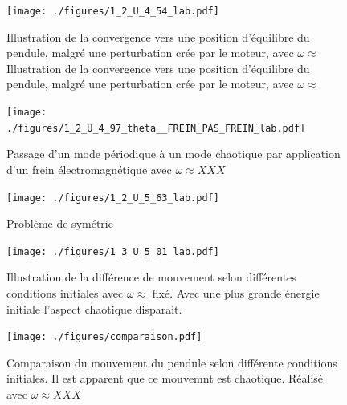 \documentclass[a4paper,12pt,oneside]{article}
\begin{document}
\begin{figure}[h!]
  \begin{center}
  \texttt{[image: ./figures/1\_2\_U\_4\_54\_lab.pdf]}
  \caption{Illustration de la convergence vers une position d'équilibre du pendule, malgré une perturbation crée par le moteur, avec $\omega \approx$Illustration de la convergence vers une position d'équilibre du pendule, malgré une perturbation crée par le moteur, avec $\omega \approx$} \label{fig:1_2_U_4_54_lab}
  \end{center}
\end{figure}

\begin{figure}[h!]
  \begin{center}
  \texttt{[image: ./figures/1\_2\_U\_4\_97\_theta\_\_FREIN\_PAS\_FREIN\_lab.pdf]}
  \caption{Passage d'un mode périodique à un mode chaotique par application d'un frein électromagnétique avec $\omega \approx XXX$} \label{fig:1_2_U_4_97_theta__FREIN_PAS_FREIN_lab}
  \end{center}
\end{figure}


\begin{figure}[h!]
  \begin{center}
  \texttt{[image: ./figures/1\_2\_U\_5\_63\_lab.pdf]}
  \caption{Problème de symétrie} \label{fig:1_2_U_5_63_lab}
  \end{center}
\end{figure}

\begin{figure}[h!]
  \begin{center}
  \texttt{[image: ./figures/1\_3\_U\_5\_01\_lab.pdf]}
  \caption{Illustration de la différence de mouvement selon différentes conditions initiales avec $\omega\approx$ fixé. Avec une plus grande énergie initiale l'aspect chaotique disparait.} \label{fig:1_3_U_5_01_lab}
  \end{center}
\end{figure}

\begin{figure}[h!]
  \begin{center}
  \texttt{[image: ./figures/comparaison.pdf]}
  \caption{Comparaison du mouvement du pendule selon différente conditions initiales. Il est apparent que ce mouvemnt est chaotique. Réalisé avec $\omega \approx XXX$} \label{fig:comparaison}
  \end{center}
\end{figure}
\end{document}
